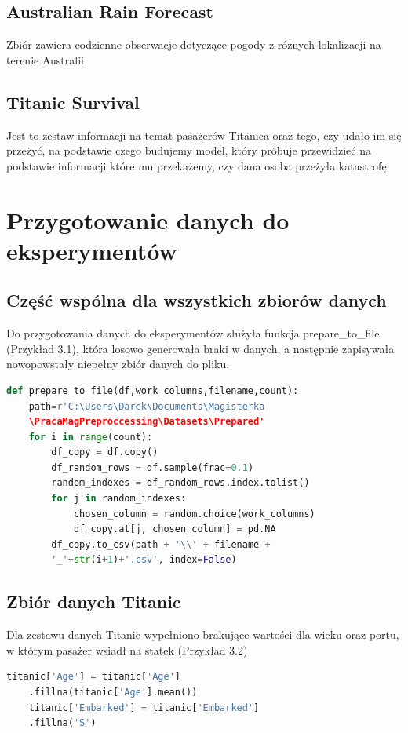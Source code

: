 \documentclass{book}
\begin{document}
\subsection{Australian Rain Forecast}
Zbiór zawiera codzienne obserwacje dotyczące pogody z różnych 
lokalizacji na terenie Australii
\subsection{Titanic Survival}
Jest to zestaw informacji na temat pasażerów Titanica oraz tego, 
czy udało im się przeżyć, na podstawie czego budujemy model, 
który próbuje przewidzieć na podstawie informacji które mu przekażemy, 
czy dana osoba przeżyła katastrofę

\section{Przygotowanie danych do eksperymentów}
\subsection{Część wspólna dla wszystkich zbiorów danych}
Do przygotowania danych do eksperymentów służyła 
funkcja prepare\_to\_file (Przykład 3.1), która losowo generowała braki w danych, a następnie 
zapisywała nowopowstały niepełny zbiór danych do pliku.

\begin{lstlisting}[language=Python, caption={Funkcja generująca braki w podanym zbiorze danych}, captionpos=b]
    def prepare_to_file(df,work_columns,filename,count):
    path=r'C:\Users\Darek\Documents\Magisterka
    \PracaMagPreproccessing\Datasets\Prepared'
    for i in range(count):
        df_copy = df.copy()
        df_random_rows = df.sample(frac=0.1)
        random_indexes = df_random_rows.index.tolist()
        for j in random_indexes:
            chosen_column = random.choice(work_columns)
            df_copy.at[j, chosen_column] = pd.NA
        df_copy.to_csv(path + '\\' + filename +
        '_'+str(i+1)+'.csv', index=False)
\end{lstlisting}

\subsection{Zbiór danych Titanic}
Dla zestawu danych Titanic wypełniono 
brakujące wartości dla wieku oraz portu, w którym pasażer
wsiadł na statek (Przykład 3.2)
 \begin{lstlisting}[language=Python, caption={Przygotowanie zbioru danych Titanic do eksperymentów}, captionpos=b]
    titanic['Age'] = titanic['Age']
    .fillna(titanic['Age'].mean())
    titanic['Embarked'] = titanic['Embarked']
    .fillna('S')
\end{lstlisting}
\end{document}
